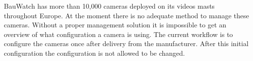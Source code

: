 


BauWatch has more than 10,000 cameras deployed on its videos masts throughout Europe. At the moment there is no adequate method to manage these cameras.
Without a proper management solution it is impossible to get an overview of what configuration a camera is using.
The current workflow is to configure the cameras once after delivery from the manufacturer.
After this initial configuration the configuration is not allowed to be changed.

